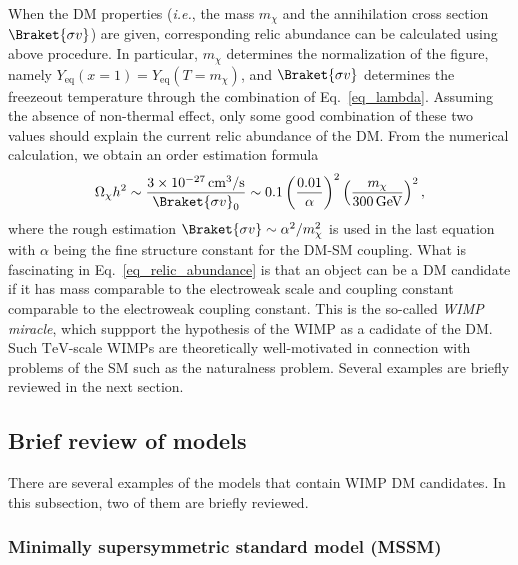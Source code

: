 \documentclass[12pt,twoside,book]{article}
\begin{document}
When the DM properties (\textit{i.e.}, the mass $m_\chi$ and the
annihilation cross section $\Braket{\sigma v}$) are given,
corresponding relic abundance can be calculated using above procedure.
In particular, $m_\chi$ determines the normalization of the figure,
namely $Y_{\mathrm{eq}} (x=1) = Y_{\mathrm{eq}} (T=m_\chi)$, and
$\Braket{\sigma v}$ determines the freezeout temperature through the
combination of Eq.~\eqref{eq_lambda}.  Assuming the absence of
non-thermal effect, only some good combination of these two values
should explain the current relic abundance of the DM.  From the
numerical calculation, we obtain an order estimation formula
\begin{align}
 \Omega_\chi h^2 \sim \frac{3 \times 10^{-27}\,\mathrm{cm^3}/\mathrm{s}}
 {\Braket{\sigma v}_0} \sim
 0.1 \left( \frac{0.01}{\alpha} \right)^2
 \left( \frac{m_\chi}{300\,\mathrm{GeV}} \right)^2,\label{eq_relic_abundance}
\end{align}
where the rough estimation $\Braket{\sigma v} \sim \alpha^2/m_\chi^2$
is used in the last equation with $\alpha$ being the fine structure
constant for the DM-SM coupling.  What is fascinating in
Eq.~\eqref{eq_relic_abundance} is that an object can be a DM candidate
if it has mass comparable to the electroweak scale and coupling
constant comparable to the electroweak coupling constant.  This is the
so-called \textit{WIMP miracle}, which suppport the hypothesis of the
WIMP as a cadidate of the DM.  Such $\mathrm{TeV}$-scale WIMPs are
theoretically well-motivated in connection with problems of the SM
such as the naturalness problem.  Several examples are briefly
reviewed in the next section.

\subsection{Brief review of models}
\label{sec:mssm}

There are several examples of the models that contain WIMP DM
candidates.  In this subsection, two of them  are briefly
reviewed.  

\subsubsection*{Minimally supersymmetric standard model (MSSM)}
\end{document}
